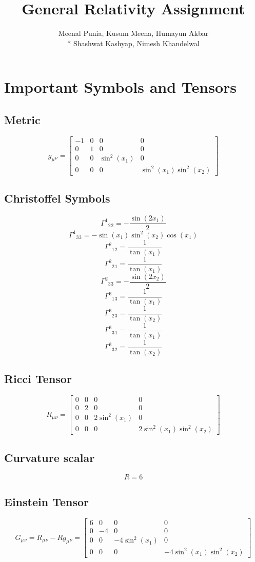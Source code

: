 \documentclass{article}
\title{General Relativity Assignment}
\author{Meenal Punia, Kusum Meena, Humayun Akbar\\* Shashwat Kashyap, Nimesh Khandelwal}
\begin{document}
\maketitle
\section{Important Symbols and Tensors}
\subsection{Metric}
$$ g_\mu{_\nu} = \left[\begin{matrix}-1 & 0 & 0 & 0\\0 & 1 & 0 & 0\\0 & 0 & \sin^{2}{\left(x_{1} \right)} & 0\\0 & 0 & 0 & \sin^{2}{\left(x_{1} \right)} \sin^{2}{\left(x_{2} \right)}\end{matrix}\right]$$
\subsection{Christoffel Symbols}
$$ \Gamma^1{_2{_2}} = - \frac{\sin{\left(2 x_{1} \right)}}{2}$$
$$ \Gamma^1{_3{_3}} = - \sin{\left(x_{1} \right)} \sin^{2}{\left(x_{2} \right)} \cos{\left(x_{1} \right)}$$
$$ \Gamma^2{_1{_2}} = \frac{1}{\tan{\left(x_{1} \right)}}$$
$$ \Gamma^2{_2{_1}} = \frac{1}{\tan{\left(x_{1} \right)}}$$
$$ \Gamma^2{_3{_3}} = - \frac{\sin{\left(2 x_{2} \right)}}{2}$$
$$ \Gamma^3{_1{_3}} = \frac{1}{\tan{\left(x_{1} \right)}}$$
$$ \Gamma^3{_2{_3}} = \frac{1}{\tan{\left(x_{2} \right)}}$$
$$ \Gamma^3{_3{_1}} = \frac{1}{\tan{\left(x_{1} \right)}}$$
$$ \Gamma^3{_3{_2}} = \frac{1}{\tan{\left(x_{2} \right)}}$$
\subsection{Ricci Tensor}
$$ R_\mu{_\nu} = \left[\begin{matrix}0 & 0 & 0 & 0\\0 & 2 & 0 & 0\\0 & 0 & 2 \sin^{2}{\left(x_{1} \right)} & 0\\0 & 0 & 0 & 2 \sin^{2}{\left(x_{1} \right)} \sin^{2}{\left(x_{2} \right)}\end{matrix}\right]$$
\subsection{Curvature scalar}
$$ R = 6$$
\subsection{Einstein Tensor}
$$ G_\mu{_\nu} = R_\mu{_\nu} - Rg_\mu{_\nu} = \left[\begin{matrix}6 & 0 & 0 & 0\\0 & -4 & 0 & 0\\0 & 0 & - 4 \sin^{2}{\left(x_{1} \right)} & 0\\0 & 0 & 0 & - 4 \sin^{2}{\left(x_{1} \right)} \sin^{2}{\left(x_{2} \right)}\end{matrix}\right]$$
\end{document}

